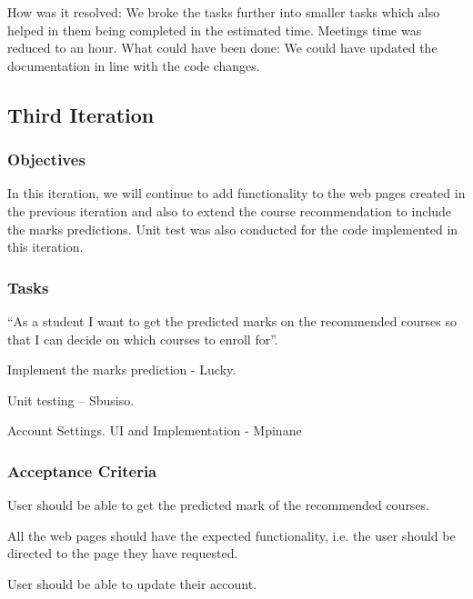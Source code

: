 \documentclass[10pt]{article}
\begin{document}
How was it resolved: We broke the tasks further into smaller tasks which also helped in them being completed in the estimated time. Meetings time was reduced to an hour.
What could have been done: We could have updated the documentation in line with the code changes. 

\subsection{Third Iteration}

\subsubsection{Objectives}

In this iteration, we will continue to add functionality to the web pages created in the previous iteration and also to extend the course recommendation to include the marks predictions. Unit test was also conducted for the code implemented in this iteration.

\subsubsection{Tasks}

“As a student I want to get the predicted marks on the recommended courses so that I can decide on which courses to enroll for”.

\begin{description}[font=$\bullet$~\normalfont\scshape\color{red!50!black}]

\item [] Implement the marks prediction - Lucky.
\item [] Unit testing – Sbusiso.
\item [] Account Settings.  UI and Implementation - Mpinane

\end{description}

\subsubsection{Acceptance Criteria}

\begin{description}[font=$\bullet$~\normalfont\scshape\color{red!50!black}]

\item [] User should be able to get the predicted mark of the recommended courses.
\item [] All the web pages should have the expected functionality, i.e.  the user should be directed to the page they have requested. 
\item [] User should be able to update their account.

\end{description}
\end{document}
